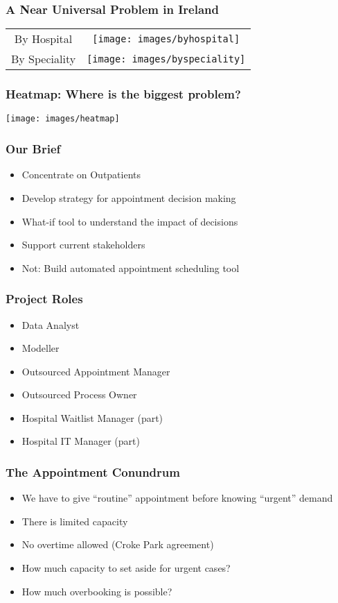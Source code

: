 \documentclass[dvipsnames]{beamer}
\begin{document}

\begin{frame}
\frametitle{A Near Universal Problem in Ireland}
\begin{tabular}{cc}
By Hospital &
\texttt{[image: images/byhospital]}\\
By Speciality &
\texttt{[image: images/byspeciality]}
\end{tabular}
\end{frame}

\begin{frame}
\frametitle{Heatmap: Where is the biggest problem?}
\texttt{[image: images/heatmap]}
\end{frame}

\begin{frame}
\frametitle{Our Brief}
\begin{itemize}
\item Concentrate on Outpatients
\item Develop strategy for appointment decision making
\item What-if tool to understand the impact of decisions
\item Support current stakeholders
\item Not: Build automated appointment scheduling tool
\end{itemize}
\end{frame}

\begin{frame}
\frametitle{Project Roles}
\begin{itemize}
\item Data Analyst
\item Modeller
\item Outsourced Appointment Manager
\item Outsourced Process Owner
\item Hospital Waitlist Manager (part)
\item Hospital IT Manager (part)
\end{itemize}
\end{frame}


\begin{frame}
\frametitle{The Appointment Conundrum}
\begin{itemize}
\item We have to give ``routine'' appointment before knowing ``urgent'' demand
\item There is limited capacity
\item No overtime allowed (Croke Park agreement)
\item How much capacity to set aside for urgent cases?
\item How much overbooking is possible?
\end{itemize}
\end{frame}
\end{document}
